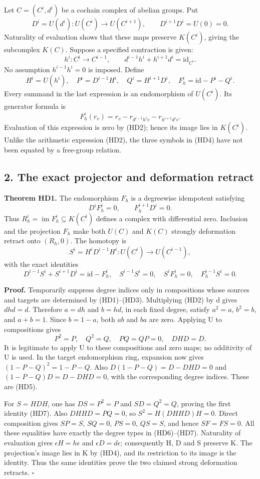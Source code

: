\documentclass[
]{article}
\begin{document}
Let \(C=(C^i,d^i)\) be a cochain complex of abelian groups. Put \[
D^i=U(d^i):U(C^i)\to U(C^{i+1}),\qquad
D^{i+1}D^i=U(0)=0.
\tag{HD1}
\] Naturality of evaluation shows that these maps preserve \(K(C^i)\),
giving the subcomplex \(K(C)\). Suppose a specified contraction is
given: \[
h^i:C^i\to C^{i-1},\qquad
d^{i-1}h^i+h^{i+1}d^i=\mathrm{id}_{C^i}.
\tag{HD2}
\] No assumption \(h^{i-1}h^i=0\) is imposed. Define \[
H^i=U(h^i),\quad
P^i=D^{i-1}H^i,\quad Q^i=H^{i+1}D^i,\quad
F_h^i=\mathrm{id}-P^i-Q^i.
\tag{HD3}
\] Every summand in the last expression is an endomorphism of
\(U(C^i)\). Its generator formula is \[
F_h^i(r_v)=r_v-r_{d^{i-1}h^iv}-r_{h^{i+1}d^iv}.
\tag{HD4}
\] Evaluation of this expression is zero by (HD2); hence its image lies
in \(K(C^i)\). Unlike the arithmetic expression (HD2), the three symbols
in (HD4) have not been equated by a free-group relation.

\subsection{2. The exact projector and deformation
retract}\label{the-exact-projector-and-deformation-retract}

\textbf{Theorem HD1.} The endomorphism \(F_h\) is a degreewise
idempotent satisfying \[
D^iF_h^i=0,\qquad F_h^{i+1}D^i=0.
\tag{HD5}
\] Thus \(R_h^i=\operatorname{im}F_h^i\subseteq K(C^i)\) defines a
complex with differential zero. Inclusion and the projection \(F_h\)
make both \(U(C)\) and \(K(C)\) strongly deformation retract onto
\((R_h,0)\). The homotopy is \[
S^i=H^iD^{i-1}H^i:U(C^i)\to U(C^{i-1}),
\tag{HD6}
\] with the exact identities \[
D^{i-1}S^i+S^{i+1}D^i=\mathrm{id}-F_h^i,
\quad S^{i-1}S^i=0,\quad S^iF_h^i=0,\quad F_h^{i-1}S^i=0.
\tag{HD7}
\]

\textbf{Proof.} Temporarily suppress degree indices only in compositions
whose sources and targets are determined by (HD1)--(HD3). Multiplying
(HD2) by d gives \(dhd=d\). Therefore \(a=dh\) and \(b=hd\), in each
fixed degree, satisfy \(a^2=a\), \(b^2=b\), and \(a+b=1\). Since
\(b=1-a\), both \(ab\) and \(ba\) are zero. Applying U to compositions
gives \[
P^2=P,\quad Q^2=Q,\quad PQ=QP=0,\quad DHD=D.
\tag{HD8}
\] It is legitimate to apply U to these compositions and zero maps; no
additivity of U is used. In the target endomorphism ring, expansion now
gives \((1-P-Q)^2=1-P-Q\). Also \(D(1-P-Q)=D-DHD=0\) and
\((1-P-Q)D=D-DHD=0\), with the corresponding degree indices. These are
(HD5).

For \(S=HDH\), one has \(DS=P^2=P\) and \(SD=Q^2=Q\), proving the first
identity (HD7). Also \(DHH D=PQ=0\), so \(S^2=H(DHH D)H=0\). Direct
composition gives \(SP=S\), \(SQ=0\), \(PS=0\), \(QS=S\), and hence
\(SF=FS=0\). All these equalities have exactly the degree types in
(HD6)--(HD7). Naturality of evaluation gives \(\epsilon H=h\epsilon\)
and \(\epsilon D=d\epsilon\); consequently H, D and S preserve K. The
projection's image lies in K by (HD4), and its restriction to its image
is the identity. Thus the same identities prove the two claimed strong
deformation retracts. \(\square\)
\end{document}
